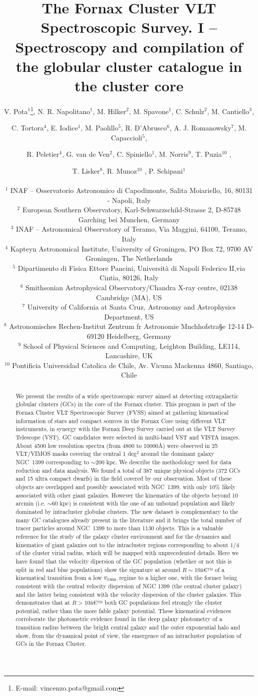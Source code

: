 \documentclass[useAMS,usenatbib]{mn2e}
\title[The Fornax Cluster VLT Spectroscopic Survey]{The Fornax Cluster VLT 
Spectroscopic Survey. I -- Spectroscopy and compilation of the globular cluster 
catalogue in the cluster core}
\author[Pota et al.]{\noindent
V. Pota$^{1}$\thanks{E-mail: vincenzo.pota@gmail.com}, 
N. R. Napolitano$^{1}$, 
M. Hilker$^{2}$, 
M. Spavone$^{1}$, 
C. Schulz$^{2}$,
M. Cantiello$^{3}$,
\and 
C. Tortora$^{4}$,
E. Iodice$^{1}$, 
M. Paolillo$^{5}$,
R. D'Abrusco$^{6}$,
A. J. Romanowsky$^{7}$,
M. Capaccioli$^{5}$, 
\and 
R. Peletier$^{4}$,
G. van de Ven$^{2}$,
C. Spiniello$^{1}$,
M. Norris$^{9}$,
T. Puzia$^{10}$ ,
\and 
T. Lisker$^{8}$,
R. Munoz$^{10}$ ,
P. Schipani$^{1}$
\\~\\
$^1$ INAF -- Osservatorio Astronomico di Capodimonte, Salita Moiariello, 16, 
80131 - Napoli, Italy\\
$^2$ European Southern Observatory, Karl-Schwarzschild-Strasse 2, D-85748 Garching bei Munchen, Germany\\
$^3$ INAF -- Astronomical Observatory of Teramo, Via Maggini, 64100, Teramo, Italy\\
$^4$ Kapteyn Astronomical Institute, University of Groningen, PO Box 72, 9700 AV Groningen, The Netherlands\\
$^5$ Dipartimento di Fisica Ettore Pancini, Universit\`a di Napoli Federico II,via Cintia, 80126, Italy\\
$^6$ Smithsonian Astrophysical Observatory/Chandra X-ray centre, 02138 Cambridge (MA), US\\
$^7$ University of California at Santa Cruz, Astronomy and Astrophysics Department, US\\
$^8$ Astronomisches Rechen-Institut Zentrum fr Astronomie Mnchhofstra§e 12-14 D-69120 Heidelberg, Germany \\
$^9$ School of Physical Sciences and Computing, Leighton Building, LE114, Lancashire, UK\\
$^{10}$ Pontificia Universidad Catolica de Chile, Av. Vicuna Mackenna 4860, Santiago, Chile 
}
\begin{document}
\label{firstpage}

\maketitle
\begin{abstract}
We present the results of a wide spectroscopic survey aimed at detecting 
extragalactic globular clusters (GCs) in the core of the Fornax cluster. This 
program is part of the Fornax Cluster VLT Spectroscopic Survey (FVSS) aimed at 
gathering kinematical information of stars and compact sources in the Fornax 
Core using different VLT instruments, in synergy with the Fornax Deep Survey 
carried out at the VLT Survey Telescope (VST). GC candidates were selected in 
multi-band VST and VISTA images. About 4500 low resolution spectra (from 4800 
to 10000\AA) were observed in 25 VLT/VIMOS masks covering the central 1 deg$^2$ 
around the dominant galaxy NGC~1399 corresponding to $\sim$200 kpc. We describe 
the methodology used for data reduction and data analysis. We found a total of 
387 unique physical objects (372 GCs and 15 ultra compact dwarfs) in the field 
covered by our observation. Most of these objects are overlapped and possibly 
associated with NGC~1399, with only 10\% likely associated with other giant 
galaxies. However the kinematics of the objects beyond 10 arcmin (i.e. $\sim$60 
kpc) is consistent with the one of an unbound population and likely dominated 
by intracluster globular clusters. The new dataset is complementary to the many 
GC catalogues already present in the literature and it brings the total number 
of tracer particles around  NGC~1399 to more than 1130 objects. This is a 
valuable reference for the study of the galaxy cluster environment and for the 
dynamics and kinematics of giant galaxies out to the intracluster regions 
corresponding to about $1/4$ of the cluster virial radius, which will be mapped 
with unprecedented details. Here we have found that the velocity dipersion of 
the GC population (whether or not this is split in red and blue populations) 
show the signature at around $R\sim10â€™$ of a kinematical transition from a low 
$v_{\rm rms}$ regime to a higher one, with the former being consistent with the 
central velocity dispersion of NGC 1399 (the central cluster galaxy) and the 
latter being consistent with the velocity dispersion of the cluster galaxies. 
This demonstrates that at $R>10â€™$ both GC populations feel strongly the cluster 
potential, rather than the more fable galaxy potential. These kinematical 
evidences corroborate the photometric evidence found in the deep galaxy 
photometry of a transition radius between the bright central galaxy and the 
outer exponential halo and show, from the dynamical point of view, the 
emergence of an intracluster population of GCs in the Fornax Cluster.

\end{abstract}
\end{document}
